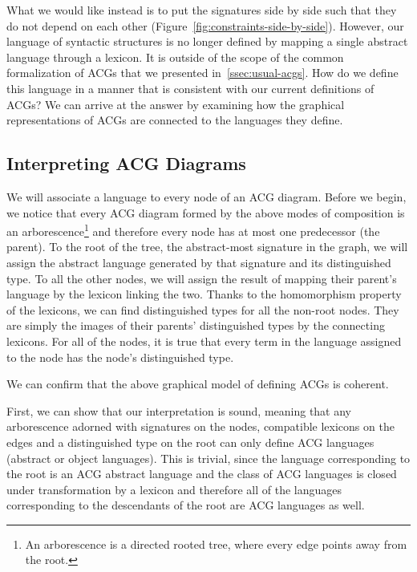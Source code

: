 What we would like instead is to put the signatures side by side such
that they do not depend on each other
(Figure~\ref{fig:constraints-side-by-side}). However, our language of
syntactic structures is no longer defined by mapping a single abstract
language through a lexicon. It is outside of the scope of the common
formalization of ACGs that we presented in~\ref{ssec:usual-acgs}. How do
we define this language in a manner that is consistent with our current
definitions of ACGs? We can arrive at the answer by examining how the
graphical representations of ACGs are connected to the languages they
define.

\subsection{Interpreting ACG Diagrams}

We will associate a language to every node of an ACG diagram. Before we
begin, we notice that every ACG diagram formed by the above modes of
composition is an arborescence\footnote{An arborescence is a directed
  rooted tree, where every edge points away from the root.} and
therefore every node has at most one predecessor (the parent). To the
root of the tree, the abstract-most signature in the graph, we will
assign the abstract language generated by that signature and its
distinguished type. To all the other nodes, we will assign the result of
mapping their parent's language by the lexicon linking the two. Thanks
to the homomorphism property of the lexicons, we can find distinguished
types for all the non-root nodes. They are simply the images of their
parents' distinguished types by the connecting lexicons. For all of the
nodes, it is true that every term in the language assigned to the node
has the node's distinguished type.

We can confirm that the above graphical model of defining ACGs is
coherent.

First, we can show that our interpretation is sound, meaning that any
arborescence adorned with signatures on the nodes, compatible lexicons
on the edges and a distinguished type on the root can only define ACG
languages (abstract or object languages). This is trivial, since the
language corresponding to the root is an ACG abstract language and the
class of ACG languages is closed under transformation by a lexicon and
therefore all of the languages corresponding to the descendants of the
root are ACG languages as well.

